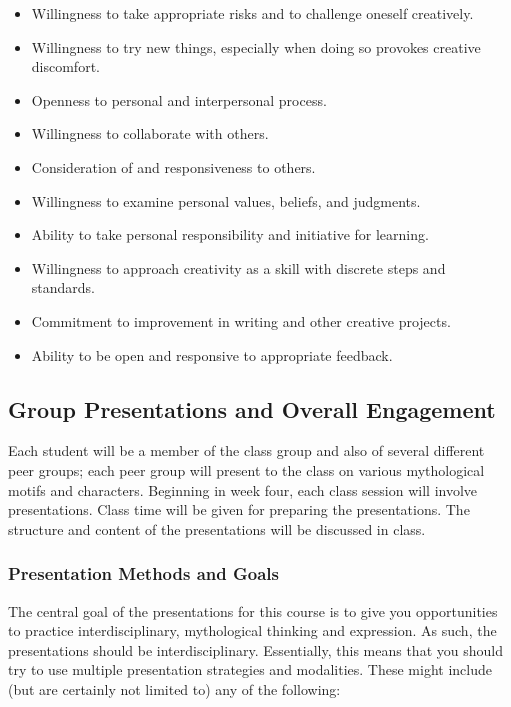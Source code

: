 \documentclass[letterpaper,10pt,headsepline]{scrreprt}
\begin{document}
\begin{itemize}
\item Willingness to take appropriate risks and to challenge oneself creatively.
\item Willingness to try new things, especially when doing so provokes creative discomfort.
\item Openness to personal and interpersonal process.
\item Willingness to collaborate with others.
\item Consideration of and responsiveness to others.
\item Willingness to examine personal values, beliefs, and judgments.
\item Ability to take personal responsibility and initiative for learning.
\item Willingness to approach creativity as a skill with discrete steps and standards.
\item Commitment to improvement in writing and other creative projects.
\item Ability to be open and responsive to appropriate feedback.
\end{itemize}

\subsection{Group Presentations and Overall Engagement}

Each student will be a member of the class group and also of several different peer groups; each peer group will present to the class on various mythological motifs and characters. Beginning in week four, each class session will involve presentations. Class time will be given for preparing the presentations. The structure and content of the presentations will be discussed in class.

\subsubsection{Presentation Methods and Goals}

The central goal of the presentations for this course is to give you opportunities to practice interdisciplinary, mythological thinking and expression. As such, the presentations should be interdisciplinary. Essentially, this means that you should try to use multiple presentation
 strategies and modalities. These might include (but are certainly not  limited to) any of the following:
\end{document}
